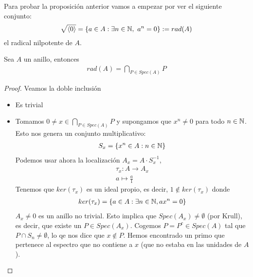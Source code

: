 Para probar la proposición anterior vamos a empezar por ver el siguiente conjunto:
\begin{gather*}
    \sqrt{\langle 0 \rangle} = \{a\in A : \exists n \in \mathbb{N},\ a^n=0\} := rad(A)
\end{gather*}
el radical nilpotente de $A$.

\begin{lema}
    Sea $A$ un anillo, entonces
    \begin{gather*}
        rad(A) = \bigcap_{P\in Spec(A)} P
    \end{gather*}
    \begin{proof}
        Veamos la doble inclusión
        \begin{itemize}
            \item[$\subseteq$ )] Es trivial %
            \item[$\supseteq$ )] Tomamos $0\neq x \in \bigcap_{P\in Spec(A)} P$ y supongamos que $x^n \neq 0$ para todo $n\in \mathbb{N}$. Esto nos genera un conjunto multiplicativo:
            \begin{gather*}
                S_x = \{x^n\in A : n\in \mathbb{N}\}
            \end{gather*}
            Podemos usar ahora la localización $A_x = A \cdot S^{-1}_x$, 
            \begin{gather*}
                \tau_x: A \to A_x\\
                a \mapsto \frac{a}{1}
            \end{gather*}
            Tenemos que $ker(\tau_x)$ es un ideal propio, es decir, $1\notin ker(\tau_x)$ donde
            \begin{gather*}
                ker(\tau_x) = \{a\in A : \exists n \in \mathbb{N} , ax^n=0\}
            \end{gather*}
            $A_x\neq 0$ es un anillo no trivial. Esto implica que $Spec(A_x)\neq \emptyset$ (por Krull), es decir, que existe un $P\in Spec(A_x)$. Cogemos $P = P^c\in Spec(A)$ tal que $P\cap S_n\neq \emptyset$, lo qe nos dice que $x\notin P$. Hemos encontrado un primo que pertenece al espectro que no contiene a $x$ (que no estaba en las unidades de $A$).
        \end{itemize}
    \end{proof}
\end{lema}

